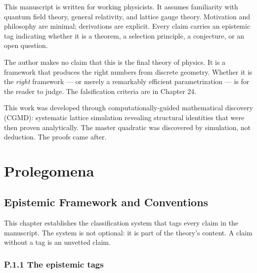 \documentclass[
  11pt,
  letterpaper,
  twoside,
  openright]{book}
\begin{document}
This manuscript is written for working physicists. It assumes
familiarity with quantum field theory, general relativity, and lattice
gauge theory. Motivation and philosophy are minimal; derivations are
explicit. Every claim carries an epistemic tag indicating whether it is
a theorem, a selection principle, a conjecture, or an open question.

The author makes no claim that this is the final theory of physics. It
is a framework that produces the right numbers from discrete geometry.
Whether it is the \emph{right} framework --- or merely a remarkably
efficient parametrization --- is for the reader to judge. The
falsification criteria are in Chapter 24.

\begin{tcolorbox}[enhanced jigsaw, coltitle=black, colbacktitle=quarto-callout-note-color!10!white, toprule=.15mm, colframe=quarto-callout-note-color-frame, arc=.35mm, opacityback=0, bottomtitle=1mm, toptitle=1mm, breakable, colback=white, titlerule=0mm, opacitybacktitle=0.6, title=\textcolor{quarto-callout-note-color}{\faInfo}\hspace{0.5em}{Methodology}, rightrule=.15mm, bottomrule=.15mm, leftrule=.75mm, left=2mm]

This work was developed through computationally-guided mathematical
discovery (CGMD): systematic lattice simulation revealing structural
identities that were then proven analytically. The master quadratic was
discovered by simulation, not deduction. The proofs came after.

\end{tcolorbox}

\part{Prolegomena}

\chapter{Epistemic Framework and Conventions}\label{sec-epistemic}

This chapter establishes the classification system that tags every claim
in the manuscript. The system is not optional: it is part of the
theory's content. A claim without a tag is an unvetted claim.

\section{P.1.1 The epistemic tags}\label{p.1.1-the-epistemic-tags}
\end{document}
